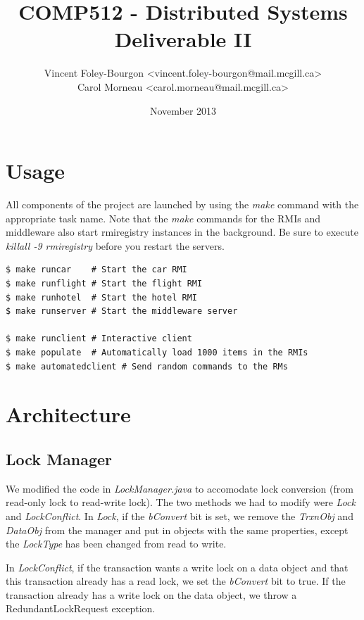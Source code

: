 \documentclass[10pt]{article}
\begin{document}
\title{COMP512 - Distributed Systems \\ Deliverable II}
\author{
  Vincent Foley-Bourgon <vincent.foley-bourgon@mail.mcgill.ca> \\
  Carol Morneau <carol.morneau@mail.mcgill.ca>
}
\date{November 2013}

\maketitle


\section{Usage}

All components of the project are launched by using the {\it make}
command with the appropriate task name.  Note that the {\it make}
commands for the RMIs and middleware also start rmiregistry instances
in the background.  Be sure to execute {\it killall -9 rmiregistry}
before you restart the servers.


\begin{verbatim}
$ make runcar    # Start the car RMI
$ make runflight # Start the flight RMI
$ make runhotel  # Start the hotel RMI
$ make runserver # Start the middleware server

$ make runclient # Interactive client
$ make populate  # Automatically load 1000 items in the RMIs
$ make automatedclient # Send random commands to the RMs
\end{verbatim}

\section{Architecture}

\subsection{Lock Manager}

We modified the code in {\it LockManager.java} to accomodate lock
conversion (from read-only lock to read-write lock).  The two methods
we had to modify were {\it Lock} and {\it LockConflict}.  In {\it
  Lock}, if the {\it bConvert} bit is set, we remove the {\it TrxnObj}
and {\it DataObj} from the manager and put in objects with the same
properties, except the {\it LockType} has been changed from read to
write.

In {\it LockConflict}, if the transaction wants a write lock on a data
object and that this transaction already has a read lock, we set the
{\it bConvert} bit to true.  If the transaction already has a write
lock on the data object, we throw a RedundantLockRequest exception.
\end{document}
